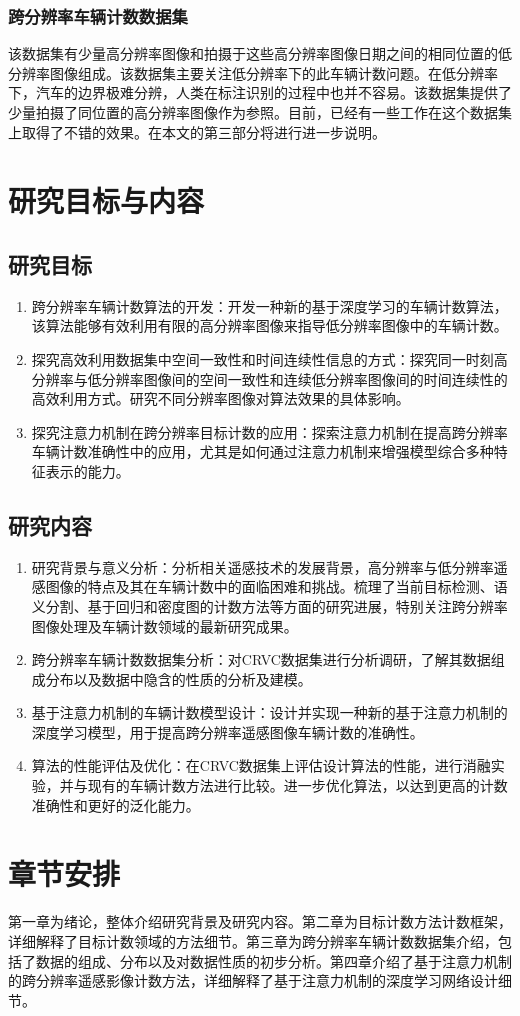 \subsubsection{跨分辨率车辆计数数据集}
该数据集有少量高分辨率图像和拍摄于这些高分辨率图像日期之间的相同位置的低分辨率图像组成。该数据集主要关注低分辨率下的此车辆计数问题。在低分辨率下，汽车的边界极难分辨，人类在标注识别的过程中也并不容易。该数据集提供了少量拍摄了同位置的高分辨率图像作为参照。目前，已经有一些工作在这个数据集上取得了不错的效果。在本文的第三部分将进行进一步说明。
\section{研究目标与内容}
\subsection{研究目标}
\begin{enumerate}    
    \item 跨分辨率车辆计数算法的开发：开发一种新的基于深度学习的车辆计数算法，该算法能够有效利用有限的高分辨率图像来指导低分辨率图像中的车辆计数。
    \item 探究高效利用数据集中空间一致性和时间连续性信息的方式：探究同一时刻高分辨率与低分辨率图像间的空间一致性和连续低分辨率图像间的时间连续性的高效利用方式。研究不同分辨率图像对算法效果的具体影响。
    \item 探究注意力机制在跨分辨率目标计数的应用：探索注意力机制在提高跨分辨率车辆计数准确性中的应用，尤其是如何通过注意力机制来增强模型综合多种特征表示的能力。
\end{enumerate}

\subsection{研究内容}
\begin{enumerate}
    \item 研究背景与意义分析：分析相关遥感技术的发展背景，高分辨率与低分辨率遥感图像的特点及其在车辆计数中的面临困难和挑战。梳理了当前目标检测、语义分割、基于回归和密度图的计数方法等方面的研究进展，特别关注跨分辨率图像处理及车辆计数领域的最新研究成果。
    \item 跨分辨率车辆计数数据集分析：对CRVC数据集进行分析调研，了解其数据组成分布以及数据中隐含的性质的分析及建模。
    \item 基于注意力机制的车辆计数模型设计：设计并实现一种新的基于注意力机制的深度学习模型，用于提高跨分辨率遥感图像车辆计数的准确性。
    \item 算法的性能评估及优化：在CRVC数据集上评估设计算法的性能，进行消融实验，并与现有的车辆计数方法进行比较。进一步优化算法，以达到更高的计数准确性和更好的泛化能力。
\end{enumerate}

\section{章节安排}
第一章为绪论，整体介绍研究背景及研究内容。第二章为目标计数方法计数框架，详细解释了目标计数领域的方法细节。第三章为跨分辨率车辆计数数据集介绍，包括了数据的组成、分布以及对数据性质的初步分析。第四章介绍了基于注意力机制的跨分辨率遥感影像计数方法，详细解释了基于注意力机制的深度学习网络设计细节。
